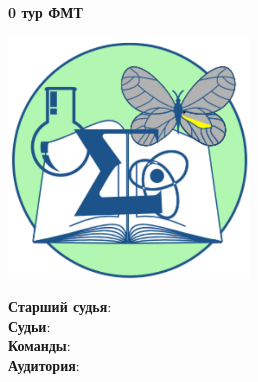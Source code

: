 \documentclass[12pt]{article}
\begin{document}
\begin{center}
{\Huge \bf 0 тур ФМТ}
\end{center}
\begin{minipage}{.30\textwidth}
\begin{center}
\includegraphics[width=0.48\textwidth]{klshlogo.pdf}
\end{center}
\end{minipage}
\begin{minipage}{.65\textwidth}
\begin{flushleft}
{\bf Старший судья}: \\ 
{\bf Судьи}: \\ 
{\bf Команды}: \\ 
{\bf Аудитория}: \\ 
\end{flushleft}
\end{minipage}
\end{document}
